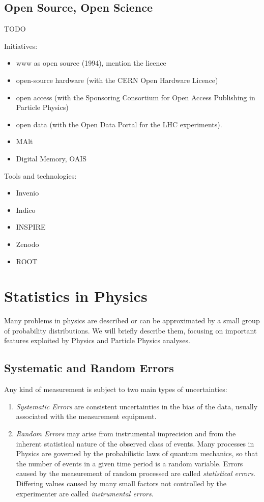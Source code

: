 \subsection{Open Source, Open Science}

TODO

Initiatives:

\begin{itemize}
	\item www as open source (1994), mention the licence
	\item open-source hardware (with the CERN Open Hardware Licence)
	\item open access (with the Sponsoring Consortium for Open Access Publishing in Particle Physics)
	\item open data (with the Open Data Portal for the LHC experiments).
	\item MAlt
	\item Digital Memory, OAIS
\end{itemize}

Tools and technologies:

\begin{itemize}
	\item Invenio
	\item Indico
	\item INSPIRE
	\item Zenodo
	\item ROOT
\end{itemize}
\section{Statistics in Physics}

Many problems in physics are described or can be approximated by a small group of probability distributions. We will briefly describe them, focusing on important features exploited by Physics and Particle Physics \cite{leo2012techniques} analyses.

\subsection{Systematic and Random Errors}

Any kind of measurement is subject to two main types of uncertainties:

\begin{enumerate}
	\item \textit{Systematic Errors} are consistent uncertainties in the bias of the data, usually associated with the measurement equipment.
	\item \textit{Random Errors} may arise from instrumental imprecision and from the inherent statistical nature of the observed class of events. Many processes in Physics are governed by the probabilistic laws of quantum mechanics, so that the number of events in a given time period is a random variable. Errors caused by the measurement of random processed are called \textit{statistical errors}. Differing values caused by many small factors not controlled by the experimenter are called \textit{instrumental errors}.
\end{enumerate}

